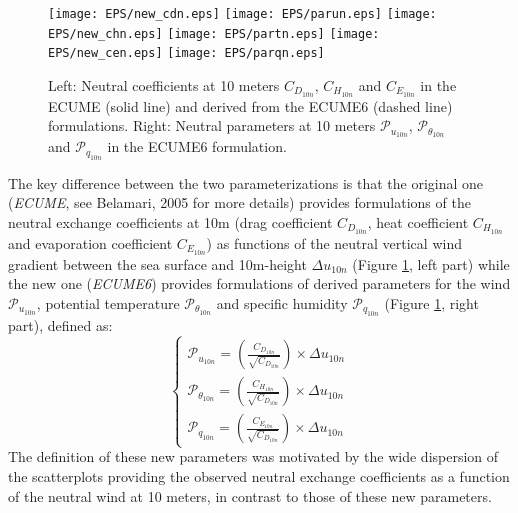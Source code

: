 

\begin{figure}
 \centering\texttt{[image: EPS/new\_cdn.eps]}
 \centering\texttt{[image: EPS/parun.eps]}
 \centering\texttt{[image: EPS/new\_chn.eps]}
 \centering\texttt{[image: EPS/partn.eps]}
 \centering\texttt{[image: EPS/new\_cen.eps]}
 \centering\texttt{[image: EPS/parqn.eps]}
	\caption{Left: Neutral coefficients at 10 meters $C_{D_{10n}}$, $C_{H_{10n}}$ and $C_{E_{10n}}$ in the ECUME 
	(solid line) and derived from the ECUME6 (dashed line) formulations. 
	Right: Neutral parameters at 10 meters $\mathcal{P}_{u_{10n}}$, $\mathcal{P}_{{\theta}_{10n}}$ and $\mathcal{P}_{q_{10n}}$ 
	in the ECUME6 formulation.\label{ecume_coef}}
\end{figure}

The key difference between the two parameterizations is that the original one (\textit{ECUME}, see Belamari, 2005 %
for more details) provides formulations
of the neutral exchange coefficients at 10m (drag coefficient $C_{D_{10n}}$, heat coefficient $C_{H_{10n}}$ and 
evaporation coefficient $C_{E_{10n}}$) as functions of the neutral vertical wind gradient between the sea surface and 
10m-height $\Delta u_{10n}$ 
(Figure \ref{ecume_coef}, left part) while the new one (\textit{ECUME6}) provides formulations of derived parameters for the wind
$\mathcal{P}_{u_{10n}}$, potential temperature $\mathcal{P}_{{\theta}_{10n}}$ and specific humidity $\mathcal{P}_{q_{10n}}$
(Figure \ref{ecume_coef}, right part), defined as:
\begin{equation}
\left\{
\begin{array}{l}
	\mathcal{P}_{u_{10n}}=\left(\frac{C_{D_{10n}}}{\sqrt{C_{D_{10n}}}}\right)\times \Delta u_{10n} \\
	\mathcal{P}_{{\theta}_{10n}}=\left(\frac{C_{H_{10n}}}{\sqrt{C_{D_{10n}}}}\right)\times \Delta u_{10n} \\
	\mathcal{P}_{q_{10n}}=\left(\frac{C_{E_{10n}}}{\sqrt{C_{D_{10n}}}}\right)\times \Delta u_{10n} 
\end{array}
\right.
\end{equation}
The definition of these new parameters was motivated by the wide dispersion of the scatterplots providing the observed 
neutral exchange coefficients as a function of the neutral wind at 10 meters, in contrast to those of these new
parameters.\\

